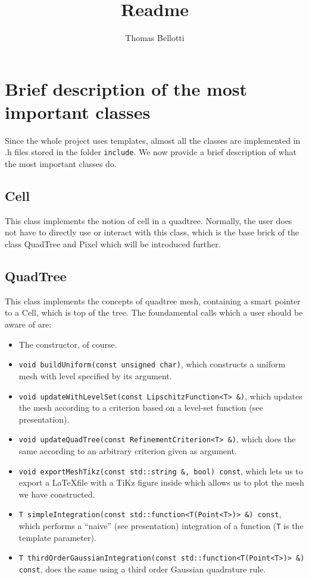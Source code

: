 \documentclass[a4paper,10pt]{article}
\title{Readme}
\author{Thomas Bellotti}
\begin{document}
\maketitle

\tableofcontents

\section{Brief description of the most important classes}
Since the whole project uses templates, almost all the classes are implemented in .h files stored in the folder \texttt{include}.
We now provide a brief description of what the most important classes do.
\subsection{Cell}
This class implements the notion of cell in a quadtree. Normally, the user does not have to directly use or interact with this class, which is the base brick of the class QuadTree and Pixel which will be introduced further.
\subsection{QuadTree}
This class implements the concepts of quadtree mesh, containing a smart pointer to a Cell, which is top of the tree.
The foundamental calls which a user should be aware of are:
\begin{itemize}
 \item The constructor, of course.
 \item \texttt{void buildUniform(const unsigned char)}, which constructs a uniform mesh with level specified by its argument.
 \item \texttt{void updateWithLevelSet(const LipschitzFunction<T> \&)}, which updates the mesh according to a criterion based on a level-set function (see presentation).
 \item \texttt{void updateQuadTree(const RefinementCriterion<T> \&)}, which does the same according to an arbitrary criterion given as argument.
 \item \texttt{void exportMeshTikz(const std::string \&, bool) const}, which lets us to export a \LaTeX file with a TiKz figure inside which allows us to plot the mesh we have constructed. 
 \item \texttt{T simpleIntegration(const std::function<T(Point<T>)> \&) const}, which performs a ``naive'' (see presentation) integration of a function (\texttt{T} is the template parameter).
 \item \texttt{T thirdOrderGaussianIntegration(const std::function<T(Point<T>)> \&) const}, does the same using a third order Gaussian quadrature rule.
\end{itemize}
\end{document}
